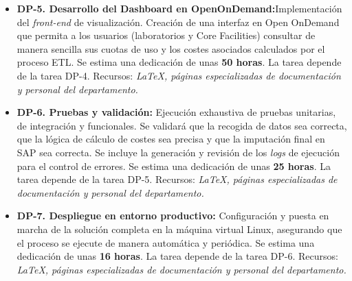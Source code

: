 \begin{itemize}
    \item \textbf{DP-5. Desarrollo del Dashboard en OpenOnDemand:}Implementación del \textit{front-end} de visualización. Creación de una interfaz en Open OnDemand 
    que permita a los usuarios (laboratorios y Core Facilities) consultar de manera sencilla sus cuotas de uso y los costes asociados calculados por el proceso ETL. Se estima 
    una dedicación de unas \textbf{50 horas}.
    \newline La tarea depende de la tarea DP-4.
    \newline Recursos: \textit {LaTeX, páginas especializadas de documentación y personal del departamento.}
    
    \item \textbf{DP-6. Pruebas y validación:} Ejecución exhaustiva de pruebas unitarias, de integración y funcionales. Se validará que la recogida de datos sea correcta,
    que la lógica de cálculo de costes sea precisa y que la imputación final en SAP sea correcta. Se incluye la generación y revisión de los \textit{logs} 
    de ejecución para el control de errores. Se estima una dedicación de unas \textbf{25 horas}.
    \newline La tarea depende de la tarea DP-5.
    \newline Recursos: \textit {LaTeX, páginas especializadas de documentación y personal del departamento.}
    
    \item \textbf{DP-7. Despliegue en entorno productivo:} Configuración y puesta en marcha de la solución completa en la máquina virtual Linux, asegurando que el proceso
    se ejecute de manera automática y periódica. Se estima una dedicación de unas \textbf{16 horas}.
    \newline La tarea depende de la tarea DP-6.
    \newline Recursos: \textit {LaTeX, páginas especializadas de documentación y personal del departamento.}
\end{itemize}